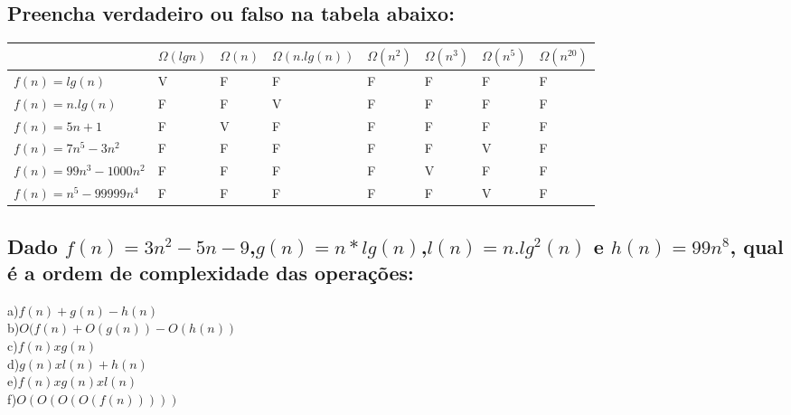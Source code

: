 \documentclass[12pt]{article}
\begin{document}
{\subsection{Preencha verdadeiro ou falso na tabela abaixo:}
\begin{table}[htb]
    \begin{tabular}{|l|l|l|l|l|l|l|l|} \hline
                              & $\Omega(lg n)$ & $\Omega(n)$ & $\Omega(n.lg(n))$ & $\Omega(n^2)$ & $\Omega(n^3)$ & $\Omega(n^5)$ & $\Omega(n^20)$ \\ \hline
    $f(n) = lg(n)$            & V              & F           & F                 & F             & F             & F             & F              \\ \hline
    $f(n) = n . lg(n)$        & F              & F           & V                 & F             & F             & F             & F              \\ \hline
    $f(n) = 5n + 1$           & F              & V           & F                 & F             & F             & F             & F              \\ \hline
    $f(n) = 7n^5 - 3n^2$      & F              & F           & F                 & F             & F             & V             & F              \\ \hline
    $f(n) = 99n^3 - 1000n^2$  & F              & F           & F                 & F             & V             & F             & F              \\ \hline
    $f(n) = n^5 - 99999n^4$   & F              & F           & F                 & F             & F             & V             & F              \\ \hline
    \end{tabular}
\end{table}

\pagebreak

\subsection{Dado $f(n)=3n^2-5n-9$,$g(n)=n*lg(n)$,$l(n)=n.lg^2(n)$ e $h(n)=99n^8$, qual é a ordem de complexidade das operações:}
a)$f(n) + g(n) - h(n)$\\
b)$O(f(n) + O(g(n)) - O(h(n))$\\
c)$f(n) x g(n)$\\
d)$g(n) x l(n) + h(n)$\\
e)$f(n) x g(n) x l(n)$\\
f)$O(O(O(O(f(n)))))$\\

}
\end{document}
